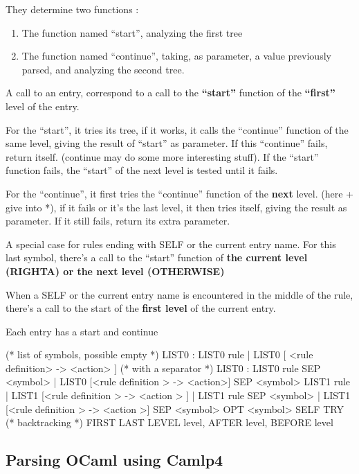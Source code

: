 \begin{enumerate}[(I)]
  They determine two functions :
  \begin{enumerate}
  \item The function named {\color{red} ``start''}, analyzing the first tree
  \item The function named {\color{red} ``continue''}, taking, as parameter, a value
    previously parsed, and analyzing the second tree. 
  \end{enumerate}

  A call to an entry, correspond to a call to the \textbf{``start''} function of
  the \textbf{``first''} level of the entry.

  For the ``start'', it tries its tree, if it works, it calls the
  ``continue'' function of the same level, giving the result of ``start''
  as parameter. If this ``continue'' fails, return itself. (continue may
  do some more interesting stuff). If the ``start'' function fails, the
  ``start'' of the next level is tested until it fails. 


  For the ``continue'', it first tries the ``continue'' function of the
  \textbf{next} level. (here + give into *), if it fails or it's the
  last level, it then tries itself, giving the result as parameter. If
  it still fails, return its extra parameter.

  A special case for rules ending with SELF or the current entry
  name. For this last symbol, there's a call to the ``start'' function
  of \textbf{the current level (RIGHTA) or the next level (OTHERWISE)}

  When a SELF or the current entry name is encountered in the middle
  of the rule, there's a call to the start of the \textbf{first level} of the
  current entry.

  Each entry has a start and continue

\begin{ocamlcode}
(* list of symbols, possible empty *)
LIST0 : LIST0 rule | LIST0 [ <rule definition> -> <action> ]
(* with a separator *)
LIST0 : LIST0 rule SEP <symbol>
| LIST0 [<rule definition > -> <action>] SEP <symbol>
  LIST1 rule
| LIST1 [<rule definition > -> <action > ]
| LIST1 rule SEP <symbol>
| LIST1 [<rule definition > -> <action >] SEP <symbol>
OPT <symbol>
SELF
TRY (* backtracking *)
FIRST LAST LEVEL level, AFTER level, BEFORE level 
\end{ocamlcode}

\end{enumerate}

\subsection{Parsing OCaml using Camlp4}

